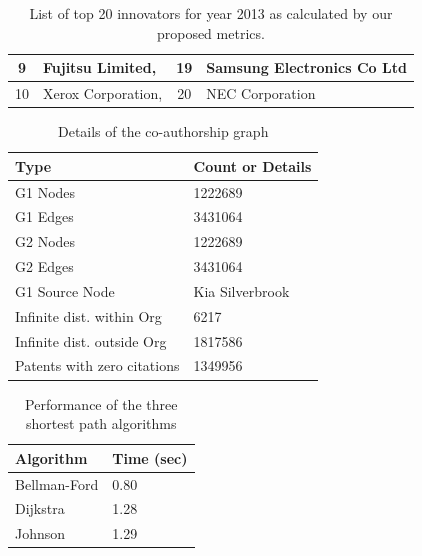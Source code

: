 \begin{table}[t]
\begin{tabular}{clcl}
\multicolumn{1}{|c|}{9}             & \multicolumn{1}{l|}{Fujitsu Limited,}                            & \multicolumn{1}{c|}{19}            & \multicolumn{1}{l|}{Samsung Electronics Co Ltd}                \\ \hline
\multicolumn{1}{|c|}{10}            & \multicolumn{1}{l|}{Xerox Corporation,}                          & \multicolumn{1}{c|}{20}            & \multicolumn{1}{l|}{NEC Corporation}                           \\ \hline                                                               
\end{tabular}
\caption{List of top 20 innovators for year 2013 as calculated by our proposed metrics.}
\label{lst:top20}
\end{table}


\begin{table}[t]
\centering

		\begin{tabular}{| l | l |}
		\hline
		
		{Type} & {Count or Details} \\
		\hline
		\hline
		G1 Nodes & 1222689 \\
		G1 Edges & 3431064 \\
		G2 Nodes & 1222689 \\
		G2 Edges & 3431064 \\
		G1 Source Node & Kia Silverbrook \\
		Infinite dist. within Org & 6217\\
		Infinite dist. outside Org& 1817586 \\
		Patents with zero citations & 1349956 \\
		\hline
	\end{tabular}		
	\caption { Details of the co-authorship graph}
	\label{tab:model}
\end{table}	

\begin{table}[t]
\centering

	\begin{tabular}{| l | l |}
		\hline
		{Algorithm} & {Time (sec)} \\
		\hline
		\hline
		Bellman-Ford & 0.80 \\
		Dijkstra & 1.28 \\
		Johnson & 1.29 \\
		\hline
	\end{tabular}
	\caption { Performance of the three shortest path algorithms}
	\label{tab:algos}
\end{table}					

